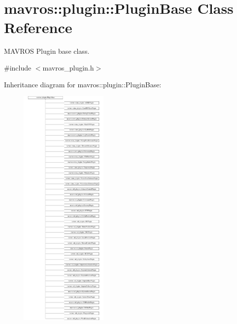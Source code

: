 \hypertarget{classmavros_1_1plugin_1_1PluginBase}{}\section{mavros\+::plugin\+::Plugin\+Base Class Reference}
\label{classmavros_1_1plugin_1_1PluginBase}


M\+A\+V\+R\+OS Plugin base class.  




{\ttfamily \#include $<$mavros\+\_\+plugin.\+h$>$}

Inheritance diagram for mavros\+::plugin\+::Plugin\+Base\+:\begin{figure}[H]
\begin{center}
\leavevmode
\includegraphics[height=12.000000cm]{classmavros_1_1plugin_1_1PluginBase}
\end{center}
\end{figure}
